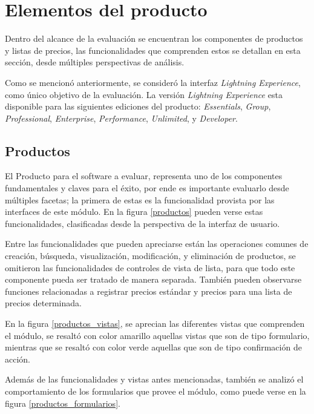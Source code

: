\section{Elementos del producto}
Dentro del alcance de la evaluación se encuentran los componentes de productos
y listas de precios, las funcionalidades que comprenden estos se detallan en
esta sección, desde múltiples perspectivas de análisis.

Como se mencionó anteriormente, se consideró la interfaz
\emph{Lightning Experience}, como único objetivo de la evaluación. La versión
\emph{Lightning Experience} esta disponible para las siguientes ediciones del
producto: \emph{Essentials}, \emph{Group}, \emph{Professional},
\emph{Enterprise}, \emph{Performance}, \emph{Unlimited}, y \emph{Developer}.

\subsection{Productos}
El Producto para el software a evaluar, representa uno de los componentes
fundamentales y claves para el éxito, por ende es importante evaluarlo
desde múltiples facetas; la primera de estas es la funcionalidad provista por
las interfaces de este módulo. En la figura \ref{productos} pueden verse estas
funcionalidades, clasificadas desde la perspectiva de la interfaz de usuario.

Entre las funcionalidades que pueden apreciarse están las operaciones comunes
de creación, búsqueda, visualización, modificación, y eliminación de productos,
se omitieron las funcionalidades de controles de vista de lista, para que
todo este componente pueda ser tratado de manera separada. También pueden
observarse funciones relacionadas a registrar precios estándar y precios para
una lista de precios determinada.

En la figura \ref{productos_vistas}, se aprecian las diferentes vistas que
comprenden el módulo, se resaltó con color amarillo aquellas vistas que son de
tipo formulario, mientras que se resaltó con color verde aquellas que son de
tipo confirmación de acción.

Además de las funcionalidades y vistas antes mencionadas, también se analizó el
comportamiento de los formularios que provee el módulo, como puede verse en la
figura \ref{productos_formularios}.

